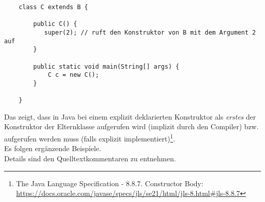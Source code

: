\begin{verbatim}
    class C extends B {

        public C() {
           super(2); // ruft den Konstruktor von B mit dem Argument 2 auf
        }

        public static void main(String[] args) {
            C c = new C();
        }

    }
\end{verbatim}

\noindent
Das zeigt, dass in Java bei einem explizit deklarierten Konstruktor als \textit{erstes}
der Konstruktor der Elternklasse aufgerufen wird (implizit durch den Compiler) bzw. aufgerufen werden muss (falls explizit implementiert)\footnote{
    The Java Language Specification - 8.8.7. Constructor Body: \url{https://docs.oracle.com/javase/specs/jls/se21/html/jls-8.html#jls-8.8.7}
}.\\

\noindent
Es folgen ergänzende Beispiele.\\
Details sind den Quelltextkommentaren zu entnehmen.

